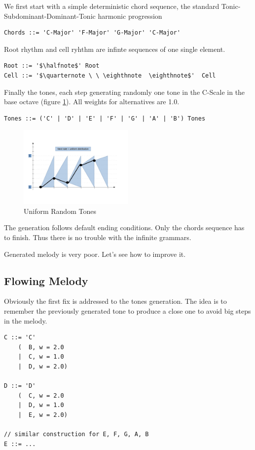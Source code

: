 \documentclass[twocolumn, 11pt]{article}
\begin{document}
We first start with a simple deterministic chord sequence, the standard Tonic-Subdominant-Dominant-Tonic harmonic progression

\begin{lstlisting}
Chords ::= 'C-Major' 'F-Major' 'G-Major' 'C-Major'
\end{lstlisting}

Root rhythm and cell ryhthm are infinte sequences of one single element.

\begin{lstlisting}
Root ::= '$\halfnote$' Root
Cell ::= '$\quarternote \ \ \eighthnote  \eighthnote$'  Cell
\end{lstlisting}

Finally the tones, each step generating randomly one tone in the C-Scale in the base octave (figure \ref{fig:unif}).
All weights for alternatives are 1.0.

\begin{lstlisting}
Tones ::= ('C' | 'D' | 'E' | 'F' | 'G' | 'A' | 'B') Tones
\end{lstlisting}

\begin{figure}[h]
  \centering
  \includegraphics[width=0.5\textwidth]{uniform}
  \caption{Uniform Random Tones}
  \label{fig:unif}
\end{figure}
The generation follows default ending conditions. Only the chords sequence has to finish. Thus there is no trouble with the infinite grammars.

Generated melody is very poor. Let's see how to improve it.

\subsection{Flowing Melody}

Obviously the first fix is addressed to the tones generation.
The idea is to remember the previously generated tone to produce a close one to avoid big steps in the melody.

\begin{lstlisting}
C ::= 'C'
    (  B, w = 2.0
    |  C, w = 1.0
    |  D, w = 2.0)

D ::= 'D'
    (  C, w = 2.0
    |  D, w = 1.0
    |  E, w = 2.0)

// similar construction for E, F, G, A, B
E ::= ...
\end{lstlisting}
\end{document}
